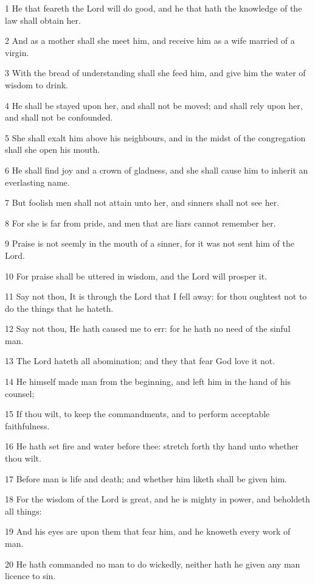\par 1 He that feareth the Lord will do good, and he that hath the knowledge of the law shall obtain her.
\par 2 And as a mother shall she meet him, and receive him as a wife married of a virgin.
\par 3 With the bread of understanding shall she feed him, and give him the water of wisdom to drink.
\par 4 He shall be stayed upon her, and shall not be moved; and shall rely upon her, and shall not be confounded.
\par 5 She shall exalt him above his neighbours, and in the midst of the congregation shall she open his mouth.
\par 6 He shall find joy and a crown of gladness, and she shall cause him to inherit an everlasting name.
\par 7 But foolish men shall not attain unto her, and sinners shall not see her.
\par 8 For she is far from pride, and men that are liars cannot remember her.
\par 9 Praise is not seemly in the mouth of a sinner, for it was not sent him of the Lord.
\par 10 For praise shall be uttered in wisdom, and the Lord will prosper it.
\par 11 Say not thou, It is through the Lord that I fell away: for thou oughtest not to do the things that he hateth.
\par 12 Say not thou, He hath caused me to err: for he hath no need of the sinful man.
\par 13 The Lord hateth all abomination; and they that fear God love it not.
\par 14 He himself made man from the beginning, and left him in the hand of his counsel;
\par 15 If thou wilt, to keep the commandments, and to perform acceptable faithfulness.
\par 16 He hath set fire and water before thee: stretch forth thy hand unto whether thou wilt.
\par 17 Before man is life and death; and whether him liketh shall be given him.
\par 18 For the wisdom of the Lord is great, and he is mighty in power, and beholdeth all things:
\par 19 And his eyes are upon them that fear him, and he knoweth every work of man.
\par 20 He hath commanded no man to do wickedly, neither hath he given any man licence to sin.

